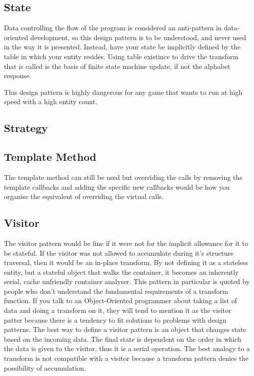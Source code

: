 \subsection{State}

Data controlling the flow of the program is considered an anti-pattern in
data-oriented development, so this design pattern is to be understood, and
never used in the way it is presented. Instead, have your state be implicitly
defined by the table in which your entity resides. Using table existince to
drive the transform that is called is the basis of finite state machine update,
if not the alphabet response.

This design pattern is highly dangerous for any game that wants to run at high
speed with a high entity count.

\subsection{Strategy}

\subsection{Template Method}

The template method can still be used but overriding the calls by removing the
template callbacks and adding the specific new callbacks would be how you
organise the equivalent of overriding the virtual calls.

\subsection{Visitor}

The visitor pattern would be fine if it were not for the implicit allowance for
it to be stateful. If the visitor was not allowed to accumulate during it's
structure traversal, then it would be an in-place transform. By not defining it
as a stateless entity, but a stateful object that walks the container, it
becomes an inherently serial, cache unfriendly container analyser. This pattern
in particular is quoted by people who don't understand the fundamental
requirements of a transform function. If you talk to an Object-Oriented
programmer about taking a list of data and doing a transform on it, they will
tend to mention it as the visitor patter because there is a tendency to fit
solutions to problems with design patterns. The best way to define a visitor
pattern is an object that changes state based on the incoming data. The final
state is dependent on the order in which the data is given to the visitor, thus
it is a serial operation. The best analogy to a transform is not compatible
with a visitor because a transform pattern denies the possibility of
accumulation.

